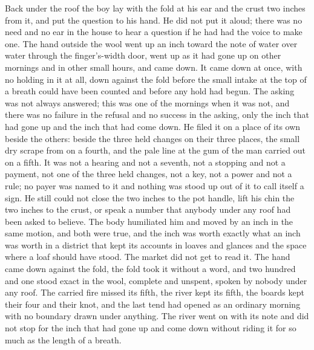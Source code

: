 Back under the roof the boy lay with the fold at his ear and the crust two inches from it, and put the question to his hand. He did not put it aloud; there was no need and no ear in the house to hear a question if he had had the voice to make one. The hand outside the wool went up an inch toward the note of water over water through the finger's-width door, went up as it had gone up on other mornings and in other small hours, and came down. It came down at once, with no holding in it at all, down against the fold before the small intake at the top of a breath could have been counted and before any hold had begun. The asking was not always answered; this was one of the mornings when it was not, and there was no failure in the refusal and no success in the asking, only the inch that had gone up and the inch that had come down. He filed it on a place of its own beside the others: beside the three held changes on their three places, the small dry scrape from  on a fourth, and the pale line at the gum of the man carried out on a fifth. It was not a hearing and not a seventh, not a stopping and not a payment, not one of the three held changes, not a key, not a power and not a rule; no payer was named to it and nothing was stood up out of it to call itself a sign. He still could not close the two inches to the pot handle, lift his chin the two inches to the crust, or speak a number that anybody under any roof had been asked to believe. The body humiliated him and moved by an inch in the same motion, and both were true, and the inch was worth exactly what an inch was worth in a district that kept its accounts in loaves and glances and the space where a loaf should have stood. The market did not get to read it. The hand came down against the fold, the fold took it without a word, and two hundred and one stood exact in the wool, complete and unspent, spoken by nobody under any roof. The carried fire missed its fifth, the river kept its fifth, the boards kept their four and their knot, and the last tend had opened as an ordinary morning with no boundary drawn under anything. The river went on with its note and did not stop for the inch that had gone up and come down without riding it for so much as the length of a breath.

